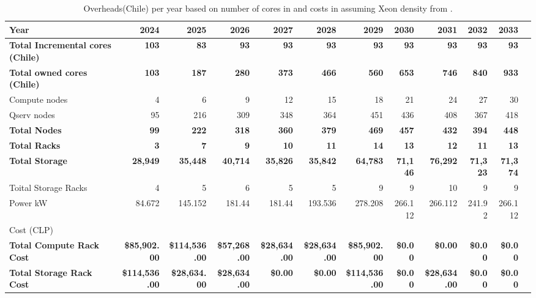 \tiny \begin{longtable} { |p{}  |r  |r  |r  |r  |r  |r  |r  |r  |r  |r  |r |} 
\caption{Overheads(Chile) per year based on number of cores in  and costs in  assuming Xeon density from .  \label{tab:opsOverheadChile}}\\ 
\hline 
\textbf{Year}&\textbf{2024}&\textbf{2025}&\textbf{2026}&\textbf{2027}&\textbf{2028}&\textbf{2029}&\textbf{2030}&\textbf{2031}&\textbf{2032}&\textbf{2033} \\ \hline
\textbf{Total Incremental cores (Chile)}&\textbf{103}&\textbf{83}&\textbf{93}&\textbf{93}&\textbf{93}&\textbf{93}&\textbf{93}&\textbf{93}&\textbf{93}&\textbf{93} \\ \hline
\textbf{Total owned cores (Chile)}&\textbf{103}&\textbf{187}&\textbf{280}&\textbf{373}&\textbf{466}&\textbf{560}&\textbf{653}&\textbf{746}&\textbf{840}&\textbf{933} \\ \hline
{Compute nodes}&{4}&{6}&{9}&{12}&{15}&{18}&{21}&{24}&{27}&{30} \\ \hline
{Qserv nodes}&{95}&{216}&{309}&{348}&{364}&{451}&{436}&{408}&{367}&{418} \\ \hline
\textbf{Total Nodes}&\textbf{99}&\textbf{222}&\textbf{318}&\textbf{360}&\textbf{379}&\textbf{469}&\textbf{457}&\textbf{432}&\textbf{394}&\textbf{448} \\ \hline
\textbf{Total Racks}&\textbf{3}&\textbf{7}&\textbf{9}&\textbf{10}&\textbf{11}&\textbf{14}&\textbf{13}&\textbf{12}&\textbf{11}&\textbf{13} \\ \hline
\textbf{Total Storage}&\textbf{28,949}&\textbf{35,448}&\textbf{40,714}&\textbf{35,826}&\textbf{35,842}&\textbf{64,783}&\textbf{71,146}&\textbf{76,292}&\textbf{71,323}&\textbf{71,374} \\ \hline
{Toital Storage Racks}&{4}&{5}&{6}&{5}&{5}&{9}&{9}&{10}&{9}&{9} \\ \hline
{Power kW
}&{84.672}&{145.152}&{181.44}&{181.44}&{193.536}&{278.208}&{266.112}&{266.112}&{241.92}&{266.112} \\ \hline
{Cost (CLP)}&&&&&&&&&& \\ \hline
\textbf{Total Compute Rack Cost}&\textbf{\$85,902.00}&\textbf{\$114,536.00}&\textbf{\$57,268.00}&\textbf{\$28,634.00}&\textbf{\$28,634.00}&\textbf{\$85,902.00}&\textbf{\$0.00}&\textbf{\$0.00}&\textbf{\$0.00}&\textbf{\$0.00} \\ \hline
\textbf{Total Storage Rack Cost}&\textbf{\$114,536.00}&\textbf{\$28,634.00}&\textbf{\$28,634.00}&\textbf{\$0.00}&\textbf{\$0.00}&\textbf{\$114,536.00}&\textbf{\$0.00}&\textbf{\$28,634.00}&\textbf{\$0.00}&\textbf{\$0.00} \\ \hline
\end{longtable} \normalsize
